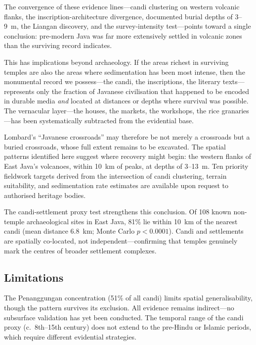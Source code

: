 \documentclass[12pt,a4paper]{article}
\begin{document}
The convergence of these evidence lines---candi clustering on western volcanic flanks, the inscription-architecture divergence, documented burial depths of 3--9~m, the Liangan discovery, and the survey-intensity test---points toward a single conclusion: pre-modern Java was far more extensively settled in volcanic zones than the surviving record indicates.

This has implications beyond archaeology. If the areas richest in surviving temples are also the areas where sedimentation has been most intense, then the monumental record we possess---the candi, the inscriptions, the literary texts---represents only the fraction of Javanese civilisation that happened to be encoded in durable media \emph{and} located at distances or depths where survival was possible. The vernacular layer---the houses, the markets, the workshops, the rice granaries---has been systematically subtracted from the evidential base.

Lombard's ``Javanese crossroads'' may therefore be not merely a crossroads but a buried crossroads, whose full extent remains to be excavated. The spatial patterns identified here suggest where recovery might begin: the western flanks of East Java's volcanoes, within 10~km of peaks, at depths of 3--13~m. Ten priority fieldwork targets derived from the intersection of candi clustering, terrain suitability, and sedimentation rate estimates are available upon request to authorised heritage bodies.

The candi-settlement proxy test strengthens this conclusion. Of 108 known non-temple archaeological sites in East Java, 81\% lie within 10~km of the nearest candi (mean distance 6.8~km; Monte Carlo $p < 0.0001$). Candi and settlements are spatially co-located, not independent---confirming that temples genuinely mark the centres of broader settlement complexes.

\subsection{Limitations}

The Penanggungan concentration (51\% of all candi) limits spatial generalisability, though the pattern survives its exclusion. All evidence remains indirect---no subsurface validation has yet been conducted. The temporal range of the candi proxy (c.~8th--15th century) does not extend to the pre-Hindu or Islamic periods, which require different evidential strategies.

\end{document}
